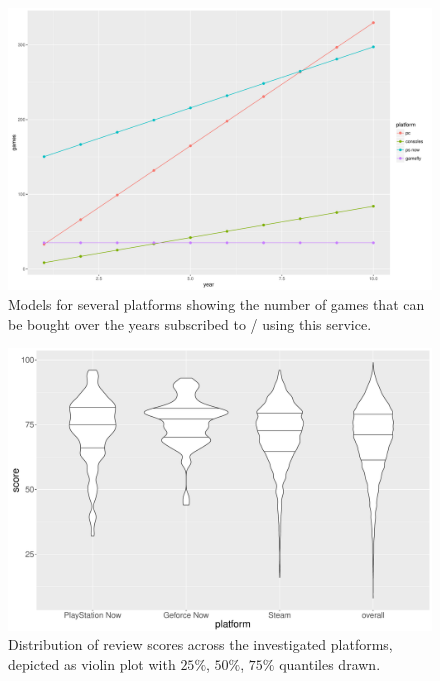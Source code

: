 \begin{figure}[!t]
	\centering
	\includegraphics[width=1.0\columnwidth]{images/games-over-year.pdf}
	\caption{Models for several platforms showing the number of games that can be bought over the years subscribed to / using this service.}
\label{fig:games-over-years}
\end{figure}



\begin{figure}[!t]
	\centering
	\includegraphics[width=1.0\columnwidth]{images/scores-by-platform-violin.pdf}
	\caption{Distribution of review scores across the investigated platforms, depicted as violin plot with $25\%$, $50\%$, $75\%$ quantiles drawn.}
\label{fig:scores-by-platform}
\end{figure}

